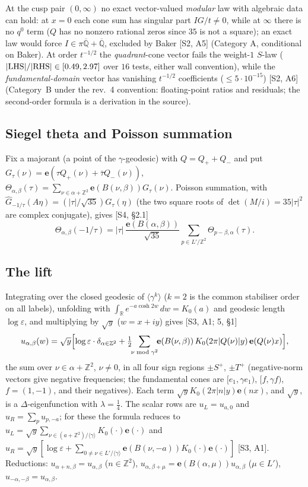 \documentclass[11pt]{article}
\theoremstyle{definition}
\theoremstyle{plain}
\newcommand{\Z}{\mathbb{Z}}
\newcommand{\R}{\mathbb{R}}
\newcommand{\Qbar}{\overline{\mathbb{Q}}}
\newcommand{\e}{\mathbf{e}}
\newcommand{\src}[1]{\textup{[S#1]}}
\begin{document}
At the cusp pair $(0,\infty)$ no exact vector-valued \emph{modular} law with algebraic data can hold: at $x=0$ each cone sum has singular part
$IG/t\neq0$, while at $\infty$ there is no $q^0$ term ($Q$ has no nonzero rational zeros since $35$ is not a square); an exact law would force
$I\in\pi\Qbar+\Qbar$, excluded by Baker \src{2, A5} (Category A, conditional on Baker).
At order $t^{-1/2}$ the \emph{quadrant}-cone vector fails the weight-$1$ $S$-law ($|{\rm LHS}|/|{\rm RHS}|\in[0.49,2.97]$ over $16$ tests,
either wall convention), while the \emph{fundamental-domain} vector has vanishing $t^{-1/2}$ coefficients ($\le5\cdot10^{-15}$) \src{2, A6}
(Category~B under the rev.~4 convention: floating-point ratios and residuals; the second-order formula is a derivation in the source).

\subsection{Siegel theta and Poisson summation}
Fix a majorant (a point of the $\gamma$-geodesic) with $Q=Q_++Q_-$ and put $G_\tau(\nu)=\e(\tau Q_+(\nu)+\bar\tau Q_-(\nu))$,
$\Theta_{\alpha,\beta}(\tau)=\sum_{\nu\in\alpha+\Z^2}\e(B(\nu,\beta))G_\tau(\nu)$. Poisson summation, with
$\widehat G_{-1/\tau}(A\eta)=(|\tau|/\sqrt{35})G_\tau(\eta)$ (the two square roots of $\det(M/i)=35|\tau|^2$ are complex conjugate), gives
\src{4, \S2.1}
\begin{equation}\label{eq:thetaS}
\Theta_{\alpha,\beta}(-1/\tau)=|\tau|\,\frac{\e(B(\alpha,\beta))}{\sqrt{35}}\sum_{p\in L'/\Z^2}\Theta_{p-\beta,\alpha}(\tau).
\end{equation}

\subsection{The lift}
Integrating over the closed geodesic of $\langle\gamma^k\rangle$ ($k=2$ is the common stabiliser order on all labels), unfolding with
$\int_\R e^{-a\cosh2w}\,dw=K_0(a)$ and geodesic length $\log\varepsilon$, and multiplying by $\sqrt y$ ($w=x+iy$) gives \src{3, A1; 5, \S1}
\[
u_{\alpha,\beta}(w)=\sqrt y\Bigl[\log\varepsilon\cdot\delta_{\alpha\in\Z^2}+\tfrac12\!\!\sum_{\nu\bmod\gamma^2}\!\!\e(B(\nu,\beta))\,K_0(2\pi|Q(\nu)|y)\,\e(Q(\nu)x)\Bigr],
\]
the sum over $\nu\in\alpha+\Z^2$, $\nu\neq0$, in all four sign regions $\pm S^+$, $\pm T^+$ (negative-norm vectors give negative frequencies; the
fundamental cones are $[e_1,\gamma e_1)$, $[f,\gamma f)$, $f=(1,-1)$, and their negatives). Each term $\sqrt yK_0(2\pi|n|y)\e(nx)$, and $\sqrt y$,
is a $\Delta$-eigenfunction with $\lambda=\tfrac14$. The scalar rows are $u_L=u_{a,0}$ and $u_R=\sum_pu_{p,-a}$; for these the formula reduces to
$u_L=\sqrt y\sum_{\nu\in(a+\Z^2)/\langle\gamma\rangle}K_0(\cdot)\e(\cdot)$ and
$u_R=\sqrt y[\log\varepsilon+\sum_{0\neq\nu\in L'/\langle\gamma\rangle}\e(B(\nu,-a))K_0(\cdot)\e(\cdot)]$ \src{3, A1}.
Reductions: $u_{\alpha+n,\beta}=u_{\alpha,\beta}$ ($n\in\Z^2$), $u_{\alpha,\beta+\mu}=\e(B(\alpha,\mu))u_{\alpha,\beta}$ ($\mu\in L'$),
$u_{-\alpha,-\beta}=u_{\alpha,\beta}$.
\end{document}
